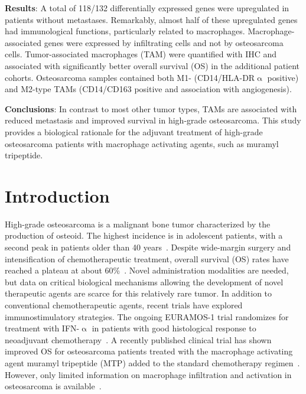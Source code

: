 \textbf{Results}: A total of 118/132 differentially expressed genes were upregulated in patients without metastases. Remarkably, almost half of these upregulated genes had immunological functions, particularly related to macrophages. Macrophage\hyp{}associated genes were expressed by infiltrating cells and not by osteosarcoma cells. Tumor\hyp{}associated macrophages (TAM) were quantified with IHC and associated with significantly better overall survival (OS) in the additional patient cohorts. Osteosarcoma samples contained both M1- (CD14/HLA-DR$\upalpha$ positive) and M2-type TAMs (CD14/CD163 positive and association with angiogenesis).

\textbf{Conclusions}: In contrast to most other tumor types, TAMs are associated with reduced metastasis and improved survival in high\hyp{}grade osteosarcoma. This study provides a biological rationale for the adjuvant treatment of high\hyp{}grade osteosarcoma patients with macrophage activating agents, such as muramyl tripeptide.

\section{Introduction}\label{introduction4}
High-grade osteosarcoma is a malignant bone tumor
characterized by the production of osteoid. The highest
incidence is in adolescent patients, with a second peak in
patients older than 40 years~\cite{raymond2002conventional}. Despite wide\hyp{}margin
surgery and intensification of chemotherapeutic treatment,
overall survival (OS) rates have reached a plateau at about
60\%~\cite{lewis2007improvement,bacci2006prognostic,bielack2002prognostic}. Novel administration modalities are needed,
but data on critical biological mechanisms allowing the
development of novel therapeutic agents are scarce for this
relatively rare tumor. In addition to conventional chemotherapeutic
agents, recent trials have explored immunostimulatory
strategies. The ongoing EURAMOS-1 trial
randomizes for treatment with IFN-$\upalpha$ in patients with good
histological response to neoadjuvant chemotherapy~\cite{marina2009international}. A
recently published clinical trial has shown improved OS for
osteosarcoma patients treated with the macrophage activating
agent muramyl tripeptide (MTP) added to the standard
chemotherapy regimen~\cite{meyers2008osteosarcoma}. However, only limited information
on macrophage infiltration and activation in osteosarcoma
is available~\cite{kleinerman1992unique}.

